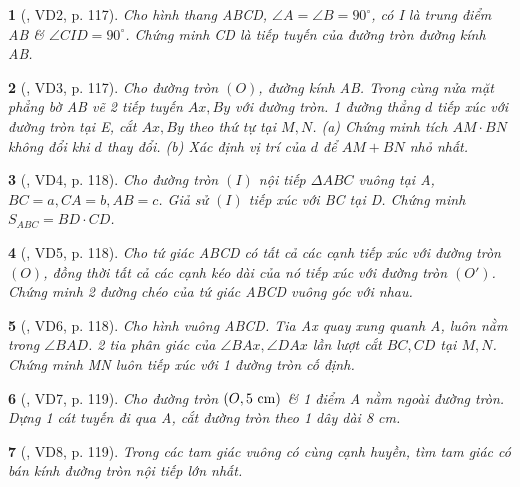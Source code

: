 \documentclass{article}
\newtheorem{baitoan}{}
\begin{document}
\begin{baitoan}[\cite{Binh_boi_duong_Toan_9_tap_1}, VD2, p. 117]
	Cho hình thang ABCD, $\angle{A} = \angle{B} = 90^\circ$, có I là trung điểm AB \& $\angle{CID} = 90^\circ$. Chứng minh CD là tiếp tuyến của đường tròn đường kính AB.
\end{baitoan}

\begin{baitoan}[\cite{Binh_boi_duong_Toan_9_tap_1}, VD3, p. 117]
	Cho đường tròn $(O)$, đường kính AB. Trong cùng nửa mặt phẳng bờ AB vẽ 2 tiếp tuyến $Ax,By$ với đường tròn. 1 đường thẳng $d$ tiếp xúc với đường tròn tại E, cắt $Ax,By$ theo thứ tự tại $M,N$. (a) Chứng minh tích $AM\cdot BN$ không đổi khi $d$ thay đổi. (b) Xác định vị trí của $d$ để $AM + BN$ nhỏ nhất.
\end{baitoan}

\begin{baitoan}[\cite{Binh_boi_duong_Toan_9_tap_1}, VD4, p. 118]
	Cho đường tròn $(I)$ nội tiếp $\Delta ABC$ vuông tại A, $BC = a,CA = b,AB = c$. Giả sử $(I)$ tiếp xúc với BC tại D. Chứng minh $S_{ABC} = BD\cdot CD$.
\end{baitoan}

\begin{baitoan}[\cite{Binh_boi_duong_Toan_9_tap_1}, VD5, p. 118]
	Cho tứ giác ABCD có tất cả các cạnh tiếp xúc với đường tròn $(O)$, đồng thời tất cả các cạnh kéo dài của nó tiếp xúc với đường tròn $(O')$. Chứng minh 2 đường chéo của tứ giác ABCD vuông góc với nhau.
\end{baitoan}

\begin{baitoan}[\cite{Binh_boi_duong_Toan_9_tap_1}, VD6, p. 118]
	Cho hình vuông ABCD. Tia Ax quay xung quanh A, luôn nằm trong $\angle{BAD}$. 2 tia phân giác của $\angle{BAx},\angle{DAx}$ lần lượt cắt $BC,CD$ tại $M,N$. Chứng minh MN luôn tiếp xúc với 1 đường tròn cố định.
\end{baitoan}

\begin{baitoan}[\cite{Binh_boi_duong_Toan_9_tap_1}, VD7, p. 119]
	Cho đường tròn $(O,5\ {\rm cm})$ \& 1 điểm A nằm ngoài đường tròn. Dựng 1 cát tuyến đi qua A, cắt đường tròn theo 1 dây dài {\rm8 cm}.
\end{baitoan}

\begin{baitoan}[\cite{Binh_boi_duong_Toan_9_tap_1}, VD8, p. 119]
	Trong các tam giác vuông có cùng cạnh huyền, tìm tam giác có bán kính đường tròn nội tiếp lớn nhất.
\end{baitoan}
\end{document}
